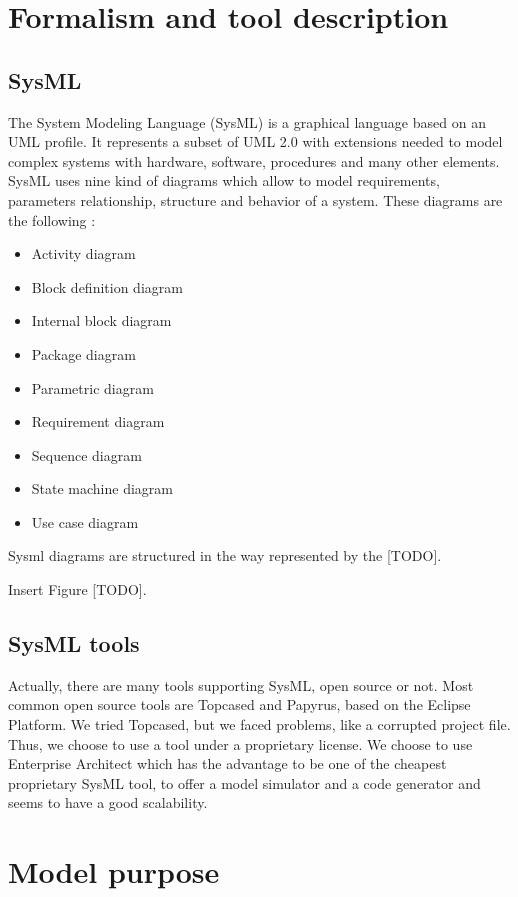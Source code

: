 \documentclass{template/openetcs_report}
\begin{document}
\section{Formalism and tool description}
\subsection{SysML}

The System Modeling Language (SysML) is a graphical language based on an UML profile. It represents a subset of UML 2.0 with extensions needed to model complex systems with hardware, software, procedures and many other elements. 
SysML uses nine kind of diagrams which allow to model requirements, parameters relationship, structure and behavior of a system. These diagrams are the following :

\begin{itemize}
	\item Activity diagram
	\item Block definition diagram
	\item Internal block diagram
	\item Package diagram
	\item Parametric diagram
	\item Requirement diagram
	\item Sequence diagram
	\item State machine diagram
	\item Use case diagram
\end{itemize}

Sysml diagrams are structured in the way represented by the [TODO].

Insert Figure [TODO].

\subsection{SysML tools}

Actually, there are many tools supporting SysML, open source or not. Most common open source tools are Topcased and Papyrus, based on the Eclipse Platform. We tried Topcased, but we faced problems, like a corrupted project file. Thus, we choose to use a tool under a proprietary license. We choose to use Enterprise Architect which has the advantage to be one of the cheapest proprietary SysML tool, to offer a model simulator and a code generator and seems to have a good scalability.

\section{Model purpose}
\end{document}
